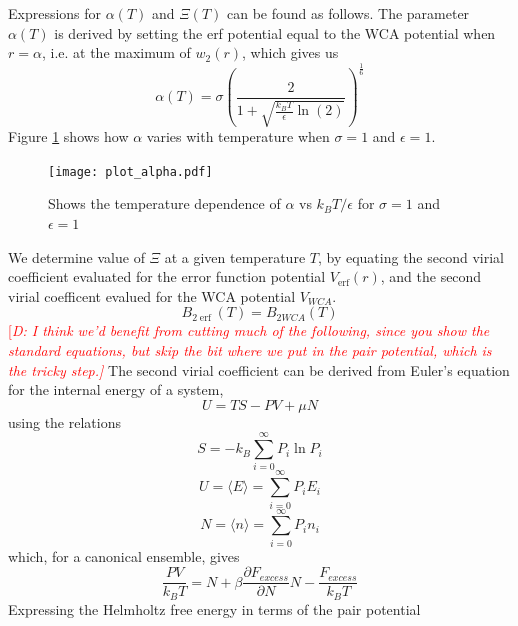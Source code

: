 \documentclass[double,12pt]{beavtex}
\newcommand\davidsays[1]{\textcolor{red}{[\it D: #1]}}
\begin{document}
Expressions for $\alpha(T)$ and $\Xi(T)$  can be found as follows. 
The parameter $\alpha(T)$ is derived by setting 
the erf potential equal to the WCA potential when $r=\alpha$, i.e. at the
maximum of $w_2(r)$,
which gives us
\begin{equation}\label{alphaT}
	{\alpha(T)=\sigma\left(\frac{2}{1+\sqrt{\frac{k_BT}{\epsilon}\ln(2)}}\right)^\frac{1}{6}}
\end{equation} 
Figure \ref{fig:alphaXivsT} shows how $\alpha$ varies with temperature 
when $\sigma=1$ and $\epsilon=1$.    
\begin{figure}[h!]
    \centering
    \texttt{[image: plot\_alpha.pdf]}
    \caption{Shows the temperature dependence of $\alpha$ vs $k_BT/{\epsilon}$ 
    for $\sigma=1$ and $\epsilon=1$}
    \label{fig:alphaXivsT}
  \end{figure}
We determine value of $\Xi$ at a given temperature $T$,
by equating the second virial coefficient evaluated for the error function 
potential $V_{\operatorname{erf}}(r)$, and the second virial coefficent evalued for the 
WCA potential $V_{WCA}$.
\begin{equation}B_{2\operatorname{erf}}(T) =B_{2WCA}(T)\end{equation}
\davidsays{I think we'd benefit from cutting much of the following, since you
show the standard equations, but skip the bit where we put in the pair potential,
which is the tricky step.}
The second virial coefficient can be derived from Euler's equation for 
the internal energy of a system, 
\begin{equation}U=TS-PV+\mu{N}\end{equation}
using the relations
\begin{equation}S=-k_B\sum_{i=0}^\infty{P_i\ln{P_i}}\end{equation}
\begin{equation}U=\langle E\rangle=\sum_{i=0}^\infty{P_iE_i}\end{equation}
\begin{equation}N=\langle n\rangle=\sum_{i=0}^\infty{P_in_i}\end{equation}
which, for a canonical ensemble, gives
\begin{equation}\frac{PV}{k_BT}=N + \beta\frac{\partial{F}_{excess}}{\partial{N}}{N} - \frac{F_{excess}}{k_BT}\end{equation}
Expressing the Helmholtz free energy in terms of the pair potential 
\end{document}
